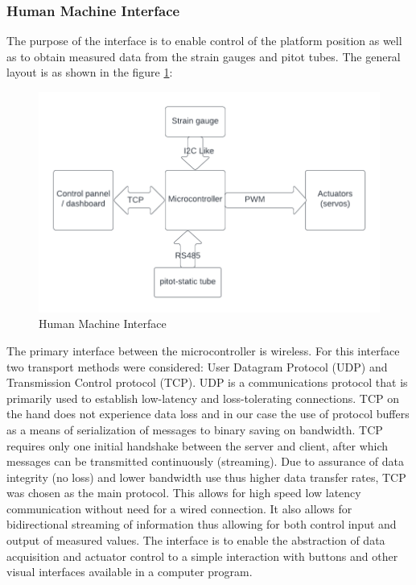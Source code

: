 \subsubsection{Human Machine Interface}
The purpose of the interface is to enable control of the platform position as well as to obtain measured data from the strain gauges and pitot tubes. 
The general layout is as shown in the figure \ref{fig:hmi}:
\begin{center}
\begin{figure}[H]
\centering
\includegraphics{Figures/Interface}
\caption[Human Machine Interface]{Human Machine Interface}
\label{fig:hmi}
\end{figure}
\end{center}

The primary interface between the microcontroller is wireless. 
For this interface two transport methods were considered: User Datagram Protocol (UDP) and Transmission Control protocol (TCP).
UDP is a communications protocol that is primarily used to establish low-latency and loss-tolerating connections.
 TCP on the hand does not experience data loss and in our case the use of protocol buffers as a means of serialization of messages to binary saving on bandwidth. 
 TCP requires only one initial handshake between the server and client, after which messages can be transmitted continuously (streaming).
 Due to assurance of data integrity (no loss) and lower bandwidth use thus higher data transfer rates, TCP was chosen as the main protocol.
  This allows for high speed low latency communication without need for a wired connection. It also allows for bidirectional streaming of information thus allowing for both control input and output of measured values. The interface is to enable the abstraction of data acquisition and actuator control to a simple interaction with buttons and other visual interfaces available in a computer program.

